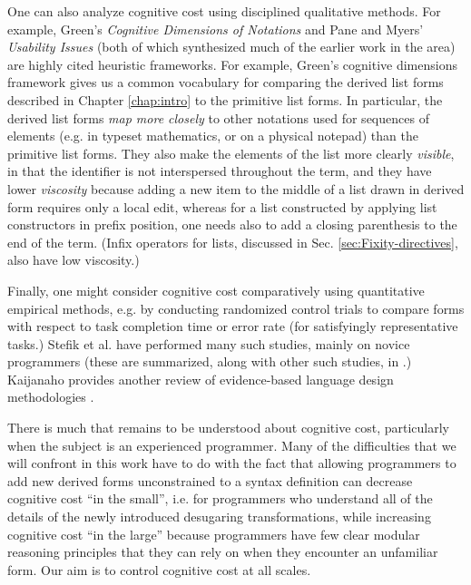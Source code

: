 One can also analyze cognitive cost using disciplined qualitative methods. For example, Green's \emph{Cognitive Dimensions of Notations} \cite{Green89,green1996usability} and Pane and Myers' \emph{Usability Issues} \cite{pane1996usability} (both of which synthesized much of the earlier work in the area) are highly cited heuristic frameworks. For example, Green's cognitive dimensions framework gives us a common vocabulary for  comparing the derived list forms described in Chapter \ref{chap:intro} to the primitive list forms. In particular, the derived list forms \emph{map more closely} to other notations used for sequences of elements (e.g. in typeset mathematics, or on a physical notepad) than the primitive list forms. They also make the elements of the list more clearly \emph{visible}, in that the identifier  is not interspersed throughout the term, and they have lower \emph{viscosity} because adding a new item to the middle of a list drawn in derived form requires only a local edit, whereas for a list constructed by applying list constructors in prefix position, one needs also to add a closing parenthesis to the end of the term. (Infix operators for lists, discussed in Sec. \ref{sec:Fixity-directives}, also have low viscosity.)

Finally, one might consider cognitive cost comparatively using quantitative empirical methods, e.g. by conducting randomized control trials to compare forms with respect to task completion time or error rate (for satisfyingly representative tasks.) Stefik et al. have performed many such studies, mainly on novice programmers (these are summarized, along with other such studies, in \cite{journals/jeric/StefikS13}.) Kaijanaho provides another review of evidence-based language design methodologies \cite{kaijanaho2015evidence}.


There is much that remains to be understood about cognitive cost, particularly when the subject is an experienced programmer. Many of the difficulties that we will confront in this work have to do with the fact that allowing programmers to add new derived forms unconstrained to a syntax definition can decrease cognitive cost ``in the small'', i.e. for programmers who understand all of the details of the newly introduced desugaring transformations, while increasing cognitive cost ``in the large'' because programmers have few clear modular reasoning principles that they can rely on when they encounter an unfamiliar form. Our aim is to control cognitive cost at all scales. %

